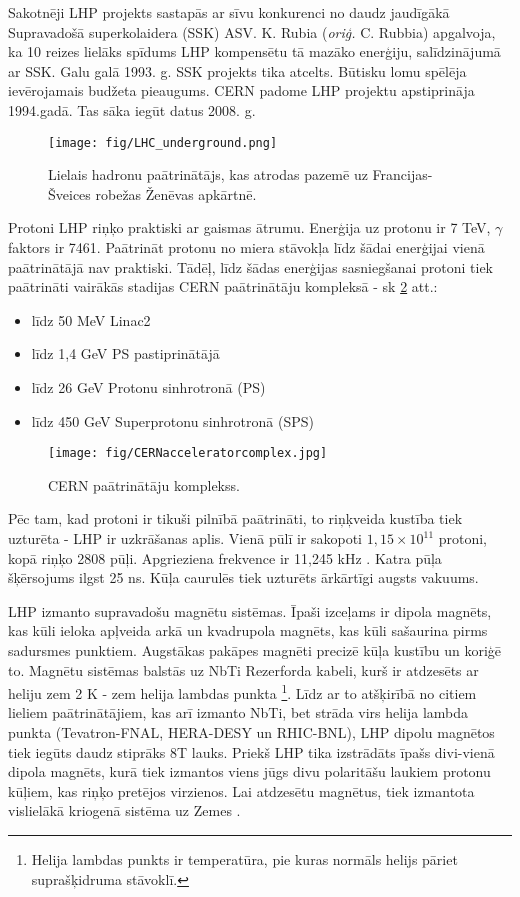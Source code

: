 Sakotnēji LHP projekts sastapās ar sīvu konkurenci no daudz jaudīgākā Supravadošā superkolaidera (SSK) ASV. K. Rubia (\textit{oriģ.} C. Rubbia) apgalvoja, ka 10 reizes lielāks spīdums LHP kompensētu tā mazāko enerģiju, salīdzinājumā ar SSK. Galu galā 1993. g. SSK projekts tika atcelts. Būtisku lomu spēlēja ievērojamais budžeta pieaugums. CERN padome LHP projektu apstiprināja 1994.gadā. Tas sāka iegūt datus 2008. g.

\begin{figure}[htpb]
  \centering
  \texttt{[image: fig/LHC\_underground.png]}
  \caption{Lielais hadronu paātrinātājs, kas atrodas pazemē uz Francijas-Šveices robežas Ženēvas apkārtnē.}
  \label{fig:LHC_underground}
\end{figure}

Protoni LHP riņķo praktiski ar gaismas ātrumu. Enerģija uz protonu ir 7 TeV, $\gamma$ faktors ir 7461. Paātrināt protonu no miera stāvokļa līdz šādai enerģijai vienā paātrinātājā nav praktiski. Tādēļ, līdz šādas enerģijas sasniegšanai protoni tiek paātrināti vairākās stadijas CERN paātrinātāju kompleksā - sk \ref{fig:CERN_accelerator_complex} att.:

\begin{itemize}
\item līdz 50 MeV Linac2
\item līdz 1,4 GeV PS \gls{pastiprinātājā}
\item līdz 26 GeV Protonu sinhrotronā (PS)
\item līdz 450 GeV Superprotonu sinhrotronā (SPS)
\end{itemize}

\begin{figure}[htpb]
  \centering
  \texttt{[image: fig/CERNacceleratorcomplex.jpg]}
  \caption{CERN paātrinātāju komplekss.}
  \label{fig:CERN_accelerator_complex}
\end{figure}

Pēc tam, kad protoni ir tikuši pilnībā paātrināti, to riņķveida kustība tiek uzturēta - LHP ir \gls{uzkrāšanas aplis}. Vienā \gls{pūlī} ir sakopoti $1,15\times10^{11}$ protoni, kopā riņķo 2808 pūļi. Apgrieziena frekvence ir 11,245 kHz \cite{Bruning:2004ej}. Katra pūļa šķērsojums ilgst 25 ns. Kūļa caurulēs tiek uzturēts ārkārtīgi augsts vakuums.

LHP izmanto supravadošu magnētu sistēmas. Īpaši izceļams ir dipola magnēts, kas kūli ieloka apļveida arkā un kvadrupola magnēts, kas kūli sašaurina pirms sadursmes punktiem. Augstākas pakāpes magnēti precizē kūļa kustību un koriģē to. Magnētu sistēmas balstās uz NbTi Rezerforda kabeli, kurš ir atdzesēts ar heliju zem 2 K - zem helija lambdas punkta \footnote{Helija lambdas punkts ir temperatūra, pie kuras normāls helijs pāriet suprašķidruma stāvoklī.}. Līdz ar to atšķirībā no citiem lieliem paātrinātājiem, kas arī izmanto NbTi, bet strāda virs helija lambda punkta (Tevatron-FNAL, HERA-DESY un RHIC-BNL), LHP dipolu magnētos tiek iegūts daudz stiprāks 8T lauks. Priekš LHP tika izstrādāts īpašs divi-vienā dipola magnēts, kurā tiek izmantos viens jūgs divu polaritāšu laukiem protonu kūļiem, kas riņķo pretējos virzienos. Lai atdzesētu magnētus, tiek izmantota vislielākā kriogenā sistēma uz Zemes \cite{MYERS:2013hra} \cite{Evans:2008zzb}.

